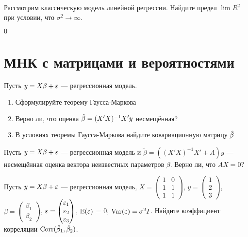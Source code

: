 \documentclass[pdftex,11pt,openany]{book}\usepackage[]{graphicx}\usepackage[]{color}
\begin{document}
\begin{solution}
\end{solution}


\begin{problem}
Рассмотрим классическую модель линейной регрессии. Найдите предел $\lim R^2$ при условии, что $\sigma^2 \rightarrow \infty$.
\end{problem}


\begin{solution}
$0$
\end{solution}

\chapter{МНК с матрицами и вероятностями}


\begin{problem} 
Пусть $y = X\beta + \varepsilon$ --- регрессионная модель.
\begin{enumerate}
\item Сформулируйте теорему Гаусса-Маркова
\item Верно ли, что оценка $\hat{\beta} = (X'X)^{-1}X'y$ несмещённая?
\item В условиях теоремы Гаусса-Маркова найдите ковариационную матрицу $\hat{\beta}$
\end{enumerate}
\end{problem}

\begin{solution}
\end{solution}

\begin{problem} 
Пусть $y = X\beta + \varepsilon$ --- регрессионная модель и $\tilde{\beta} = ((X'X)^{-1}X'+ A)y$ --- несмещённая оценка вектора неизвестных параметров $\beta$. Верно ли, что $AX=0$?
\end{problem}

\begin{solution}
\end{solution}




\begin{problem}
 Пусть $y = X\beta + \varepsilon$ --- регрессионная модель, $X = \begin{pmatrix} 1 & 0 \\ 1 & 1 \\ 1 & 1 \end{pmatrix}$, $y = \begin{pmatrix} 1 \\ 2 \\ 3 \end{pmatrix}$, $\beta = \begin{pmatrix} \beta_1 \\ \beta_2 \end{pmatrix}$, $\varepsilon = \begin{pmatrix} \varepsilon_1 \\ \varepsilon_2 \\ \varepsilon_3 \end{pmatrix}$, $\mathbb{E}(\varepsilon)$ = 0, $\operatorname{Var}(\varepsilon) = \sigma^2 I$. Найдите коэффициент корреляции $\operatorname{Corr}(\hat{\beta}_1,\hat{\beta}_2)$.

\end{problem}
\end{document}
